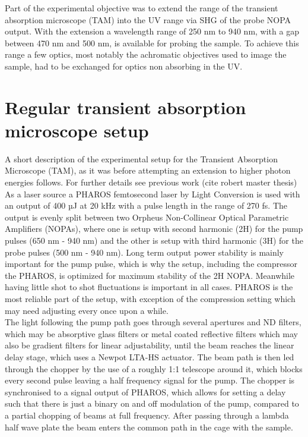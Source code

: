 \documentclass[twoside,openright]{scrreprt}
\begin{document}
Part of the experimental objective was to extend the range of the transient absorption microscope (TAM) into the UV range via SHG of the probe NOPA output. With the extension a wavelength range of 250 nm to 940 nm, with a gap between 470 nm and 500 nm, is available for probing the sample.\newline
To achieve this range a few optics, most notably the achromatic objectives used to image the sample, had to be exchanged for optics non absorbing in the UV.
\section{Regular transient absorption microscope setup}\label{RegTAM}
A short description of the experimental setup for the Transient Absorption Microscope (TAM), as it was before attempting an extension to higher photon energies follows. For further details see previous work (cite robert master thesis)\\
As a laser source a PHAROS femtosecond laser by Light Conversion is used with an output of 400 µJ at 20 kHz with a pulse length in the range of 270 fs. The output is evenly split between two Orpheus Non-Collinear Optical Parametric Amplifiers (NOPAs), where one is setup with second harmonic (2H) for the pump pulses (650 nm - 940 nm) and the other is setup with third harmonic (3H) for the probe pulses (500 nm - 940 nm). Long term output power stability is mainly important for the pump pulse, which is why the setup, including the compressor the PHAROS, is optimized for maximum stability of the 2H NOPA. Meanwhile having little shot to shot fluctuations is important in all cases. PHAROS is the most reliable part of the setup, with exception of the compression setting which may need adjusting every once upon a while.\\

The light following the pump path goes through several apertures and ND filters, which may be absorptive glass filters or metal coated reflective filters which may also be gradient filters for linear adjustability, until the beam reaches the linear delay stage, which uses a Newpot LTA-HS actuator. The beam path is then led through the chopper by the use of a roughly 1:1 telescope around it, which blocks every second pulse leaving a half frequency signal for the pump. The chopper is synchronised to a signal output of PHAROS, which allows for setting a delay such that there is just a binary on and off modulation of the pump, compared to a partial chopping of beams at full frequency. After passing through a lambda half wave plate the beam enters the common path in the cage with the sample.
\end{document}
